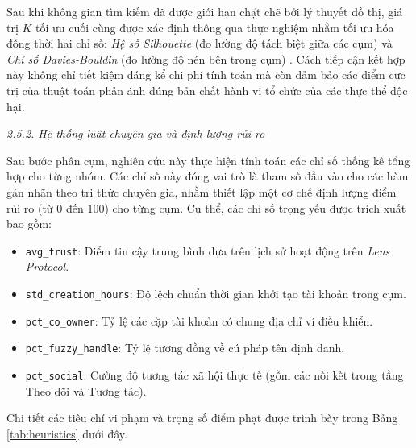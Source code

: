 Sau khi không gian tìm kiếm đã được giới hạn chặt chẽ bởi lý thuyết đồ thị, giá trị $K$ tối ưu cuối cùng được xác định thông qua thực nghiệm nhằm tối ưu hóa đồng thời hai chỉ số: \textit{Hệ số Silhouette} (đo lường độ tách biệt giữa các cụm) \cite{rousseeuw1987silhouettes} và \textit{Chỉ số Davies-Bouldin} (đo lường độ nén bên trong cụm) \cite{davies1979cluster}. Cách tiếp cận kết hợp này không chỉ tiết kiệm đáng kể chi phí tính toán mà còn đảm bảo các điểm cực trị của thuật toán phản ánh đúng bản chất hành vi tổ chức của các thực thể độc hại.\vspace{0.3cm}


\textit{2.5.2. Hệ thống luật chuyên gia và định lượng rủi ro}\vspace{0.2cm}

Sau bước phân cụm, nghiên cứu này thực hiện tính toán các chỉ số thống kê tổng hợp cho từng nhóm. Các chỉ số này đóng vai trò là tham số đầu vào cho các hàm gán nhãn theo tri thức chuyên gia, nhằm thiết lập một cơ chế định lượng điểm rủi ro (từ $0$ đến $100$) cho từng cụm. Cụ thể, các chỉ số trọng yếu được trích xuất bao gồm:\vspace{-0.1cm}
\begin{itemize}[label={--}, itemsep=1pt]
    \item \texttt{avg\_trust}: Điểm tin cậy trung bình dựa trên lịch sử hoạt động trên \textit{Lens Protocol}.
    \item \texttt{std\_creation\_hours}: Độ lệch chuẩn thời gian khởi tạo tài khoản trong cụm.
    \item \texttt{pct\_co\_owner}: Tỷ lệ các cặp tài khoản có chung địa chỉ ví điều khiển.
    \item \texttt{pct\_fuzzy\_handle}: Tỷ lệ tương đồng về cú pháp tên định danh.
    \item \texttt{pct\_social}: Cường độ tương tác xã hội thực tế (gồm các nối kết trong tầng Theo dõi và Tương tác).
\end{itemize}

Chi tiết các tiêu chí vi phạm và trọng số điểm phạt được trình bày trong Bảng \ref{tab:heuristics} dưới đây.

